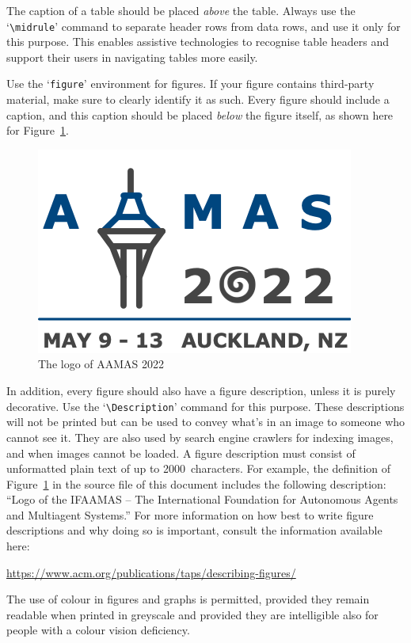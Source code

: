 \documentclass[sigconf]{aamas}
\begin{document}
The caption of a table should be placed \emph{above} the table. 
Always use the `\verb|\midrule|' command to separate header rows from 
data rows, and use it only for this purpose. This enables assistive 
technologies to recognise table headers and support their users in 
navigating tables more easily.

\balance

Use the `\texttt{figure}' environment for figures. If your figure 
contains third-party material, make sure to clearly identify it as such.
Every figure should include a caption, and this caption should be placed 
\emph{below} the figure itself, as shown here for Figure~\ref{fig:logo}.

\begin{figure}[h]
  \centering
  \includegraphics[width=0.45\linewidth]{aamas2022Logo}
  \caption{The logo of AAMAS 2022}
  \label{fig:logo}
\end{figure}

In addition, every figure should also have a figure description, unless
it is purely decorative. Use the `\verb|\Description|' command for this 
purpose. These descriptions will not be printed but can be used to 
convey what's in an image to someone who cannot see it. They are also 
used by search engine crawlers for indexing images, and when images 
cannot be loaded. A figure description must consist of unformatted plain 
text of up to 2000~characters. For example, the definition of 
Figure~\ref{fig:logo} in the source file of this document includes the 
following description: ``Logo of the IFAAMAS -- The  International Foundation for Autonomous Agents and Multiagent Systems.'' For more information on how best to write figure descriptions 
and why doing so is important, consult the information available here: 
%
\begin{center}
\url{https://www.acm.org/publications/taps/describing-figures/}
\end{center}
%
The use of colour in figures and graphs is permitted, provided they 
remain readable when printed in greyscale and provided they are 
intelligible also for people with a colour vision deficiency.
\end{document}
